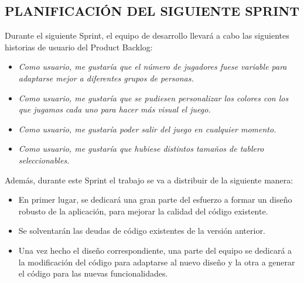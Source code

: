 \documentclass[../../SCRUM.tex]{subfiles}
\begin{document}
\subsection{PLANIFICACIÓN DEL SIGUIENTE SPRINT}
Durante el siguiente Sprint, el equipo de desarrollo llevará a cabo las siguientes historias de usuario del Product Backlog:
\begin{itemize}
\item \textit{Como usuario, me gustaría que el número de jugadores fuese variable para adaptarse mejor a diferentes grupos de personas.}
\item \textit{Como usuario, me gustaría que se pudiesen personalizar los colores con los que jugamos cada uno para hacer más visual el juego.}
\item \textit{Como usuario, me gustaría poder salir del juego en cualquier momento.}
\item \textit{Como usuario, me gustaría que hubiese distintos tamaños de tablero seleccionables.}
\end{itemize}
Además, durante este Sprint el trabajo se va a distribuir de la siguiente manera:
\begin{itemize}
\item En primer lugar, se dedicará una gran parte del esfuerzo a formar un diseño robusto de la aplicación, para mejorar la calidad del código existente.
\item Se solventarán las deudas de código existentes de la versión anterior.
\item Una vez hecho el diseño correspondiente, una parte del equipo se dedicará a la modificación del código para adaptarse al nuevo diseño y la otra a generar el código para las nuevas funcionalidades.
\end{itemize}
\end{document}
